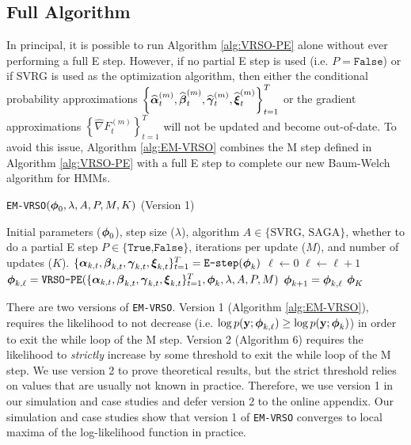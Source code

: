 \subsection{Full Algorithm}

In principal, it is possible to run Algorithm \ref{alg:VRSO-PE} alone without ever performing a full E step. However, if no partial E step is used (i.e. $P = \texttt{False}$) or if SVRG is used as the optimization algorithm, then either the conditional probability approximations $\left\{\widehat {\boldsymbol{\alpha}}_t^{(m)}, \widehat {\boldsymbol{\beta}}_t^{(m)}, \widehat {\boldsymbol{\gamma}}_t^{(m)}, \widehat {\boldsymbol{\xi}}_t^{(m)} \right\}_{t=1}^T$ or the gradient approximations $\left\{\widehat \nabla F_{t}^{(m)} \right\}_{t=1}^T$ will not be updated and become out-of-date. To avoid this issue, Algorithm \ref{alg:EM-VRSO} combines the M step defined in Algorithm \ref{alg:VRSO-PE} with a full E step to complete our new Baum-Welch algorithm for HMMs.

\begin{algorithm}
\caption{\texttt{EM-VRSO}$(\boldsymbol{\phi}_0,\lambda, A, P, M, K)$ (Version 1)}\label{alg:EM-VRSO}
\begin{algorithmic}[1]
\Require Initial parameters ($\boldsymbol{\phi}_{0}$), step size ($\lambda$), algorithm $A \in \{\text{SVRG, SAGA}\}$, whether to do a partial E step $P \in \{\texttt{True,False}\}$, iterations per update ($M$), and number of updates ($K$).
%
% 
\State $\{\boldsymbol{\alpha}_{k,t}, \boldsymbol{\beta}_{k,t}, \boldsymbol{\gamma}_{k,t}, \boldsymbol{\xi}_{k,t}\}_{t=1}^T = \texttt{E-step}(\boldsymbol{\phi}_{k})$ 
%
%
\State $\ell \gets 0$ 
%
%
\State $\ell \gets \ell+1$
\State $\boldsymbol{\phi}_{k,\ell} = \texttt{VRSO-PE}(\{\boldsymbol{\alpha}_{k,t}, \boldsymbol{\beta}_{k,t}, \boldsymbol{\gamma}_{k,t}, \boldsymbol{\xi}_{k,t}\}_{t=1}^T,\boldsymbol{\phi}_k,\lambda,A,P,M)$
%
\EndWhile
\State $\boldsymbol{\phi}_{k+1} = \boldsymbol{\phi}_{k,\ell}$
\EndFor
\State \Return $\boldsymbol{\phi}_K$
\end{algorithmic}
\end{algorithm}

There are two versions of \texttt{EM-VRSO}. Version 1 (Algorithm \ref{alg:EM-VRSO}), requires the likelihood to not decrease (i.e. $\log p(\mathbf{y};\boldsymbol{\phi}_{k,\ell}) \geq \log p(\mathbf{y};\boldsymbol{\phi}_{k})$) in order to exit the while loop of the M step. Version 2 (Algorithm 6) requires the likelihood to \textit{strictly} increase by some threshold to exit the while loop of the M step. We use version 2 to prove theoretical results, but the strict threshold relies on values that are usually not known in practice. Therefore, we use version 1 in our simulation and case studies and defer version 2 to the online appendix. Our simulation and case studies show that version 1 of \texttt{EM-VRSO} converges to local maxima of the log-likelihood function in practice. 

